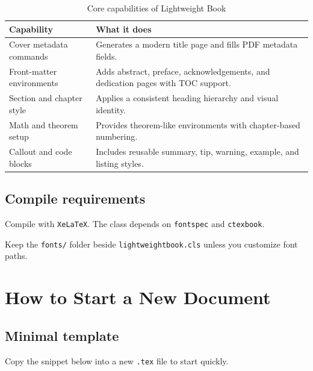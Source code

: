\documentclass[english]{lightweightbook}
\begin{document}
    \begin{table}[htbp]
        \centering
        \caption{Core capabilities of Lightweight Book}
        \begin{tabularx}{\textwidth}{@{}>{\raggedright\arraybackslash}p{}>{\raggedright\arraybackslash}X@{}}
            \toprule
            Capability & What it does \\
            \midrule
            Cover metadata commands & Generates a modern title page and fills PDF metadata fields. \\
            Front-matter environments & Adds abstract, preface, acknowledgements, and dedication pages with TOC support. \\
            Section and chapter style & Applies a consistent heading hierarchy and visual identity. \\
            Math and theorem setup & Provides theorem-like environments with chapter-based numbering. \\
            Callout and code blocks & Includes reusable summary, tip, warning, example, and listing styles. \\
            \bottomrule
        \end{tabularx}
    \end{table}


    \section{Compile requirements}
    \begin{tipbox}
        Compile with \texttt{XeLaTeX}. The class depends on \texttt{fontspec} and \texttt{ctexbook}.
    \end{tipbox}

    \begin{warningbox}
        Keep the \texttt{fonts/} folder beside \texttt{lightweightbook.cls} unless you customize font paths.
    \end{warningbox}


    \chapter{How to Start a New Document}


    \section{Minimal template}
    Copy the snippet below into a new \texttt{.tex} file to start quickly.
\end{document}
